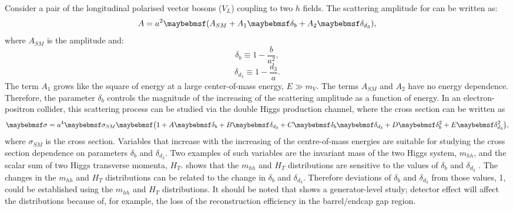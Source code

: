 Consider a pair of the longitudinal polarised  vector bosons (${V}_L$) coupling to two $h$ fields. The scattering amplitude for  can be written as:
\begin{equation}
A = a^2\parenths{A_{SM} + A_1\delta_b + A_2\delta_{d_3}},
\end{equation}
where $A_{SM}$ is the \SM amplitude and:
\begin{equation}
\delta_b \equiv 1 - \frac{b}{a^2},
\end{equation}
\begin{equation}
\delta_{d_3} \equiv 1 - \frac{d_3}{a}.
\end{equation}
The term $A_1$ grows like the square of energy at a large center-of-mass energy, $E\gg{m_V}$. The terms $A_{SM}$ and $A_2$ have no energy dependence. Therefore, the parameter $\delta_b$ controls the magnitude of the increasing of the scattering amplitude as a function of energy.  In an electron-positron collider, this scattering process can be studied via the double Higgs production  channel, where the cross section can be written as
\begin{equation}
\label{eq:theoryGeneralHiggsCrossSection}
\sigma = a^4\sigma_{SM}\parenths{1 + A\delta_b + B\delta_{d_3} + C\delta_b\delta_{d_3} + D\delta_b^2 + E\delta_{d_3}^2},
\end{equation}
where $\sigma_{SM}$ is the \SM cross section. Variables that increase with the increasing of the centre-of-mass energies are suitable for studying the cross section dependence on parameters $\delta_{b}$ and $\delta_{d_3}$. Two examples of such variables are the invariant mass of the two Higgs system, $m_{hh}$, and the scalar sum of two Higgs transverse momenta, $H_T$.  shows that the $m_{hh}$ and $H_T$ distributions are sensitive to the values of $\delta_{b}$ and $\delta_{d_3}$  \cite{Contino:2013gna}.  The changes in the  $m_{hh}$ and $H_T$ distributions can be related to the  change in $\delta_{b}$ and $\delta_{d_3}$. Therefore deviations of  $\delta_{b}$ and $\delta_{d_3}$ from those \SM values, 1, could be established using the $m_{hh}$ and $H_T$ distributions. It should be noted that   shows a generator-level study; detector effect will affect the distributions because of, for example, the loss of the reconstruction efficiency in the  barrel/endcap gap region.

